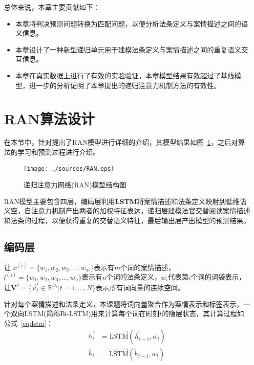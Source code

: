总体来说，本章主要贡献如下：
\begin{itemize}
    \item 本章将判决预测问题转换为匹配问题，以便分析法条定义与案情描述之间的语义信息。
    \item 本章设计了一种新型递归单元用于建模法条定义与案情描述之间的重复语义交互信息。
    \item 本章在真实数据上进行了有效的实验验证，本章模型结果有效超过了基线模型，进一步的分析证明了本章提出的递归注意力机制方法的有效性。
\end{itemize}

\section{RAN算法设计}
\label{sec:ran_algori}

在本节中，针对提出了RAN模型进行详细的介绍，其模型结果如图~\ref{fig:ran_model}，之后对算法的学习和预测过程进行介绍。
\begin{figure}[htbp]
    \centering
    \texttt{[image: ./sources/RAN.eps]}
    \vspace{-10pt}
    \caption{\label{fig:ran_model} 递归注意力网络(RAN)模型结构图 }
    \vspace{-5pt}
\end{figure}

RAN模型主要包含四层，编码层利用\textbf{LSTM}将案情描述和法条定义映射到低维语义空，自注意力机制产出两者的加权特征表达，递归层建模法官交替阅读案情描述和法条的过程，以便获得重复的交替语义特征，最后输出层产出模型的预测结果。

\subsection{编码层}
让 $x^{(i)} = {\{w_1, w_2, w_3, \dots, w_m\}}$表示有$m$个词的案情描述， $l^{(j)} = {\{w_1, w_2, w_3, \dots, w_n\}}$表示有$n$个词的法条定义，$w_i$代表第$i$个词的词袋表示，让$\textbf{V}^I=\{\vec{v}^I_t\in \mathbb{R}^{D_v}|t=1,\dots,N\}$表示所有词向量的连续空间。

针对每个案情描述和法条定义，本课题将词向量聚合作为案情表示和标签表示，一个双向LSTM(简称Bi-LSTM)用来计算每个词在时刻$t$的隐层状态，其计算过程如公式~\ref{eq:lstm}：
\begin{equation}\label{eq:lstm}
    \begin{aligned}
        \overrightarrow{h_t}&=\overrightarrow{\text{LSTM}}(\overrightarrow{h}_{t-1}, w_t)\\
        \overleftarrow{h_t}&=\overrightarrow{\text{LSTM}}(\overleftarrow{h}_{t-1}, w_t)\\
    \end{aligned}
\end{equation}

